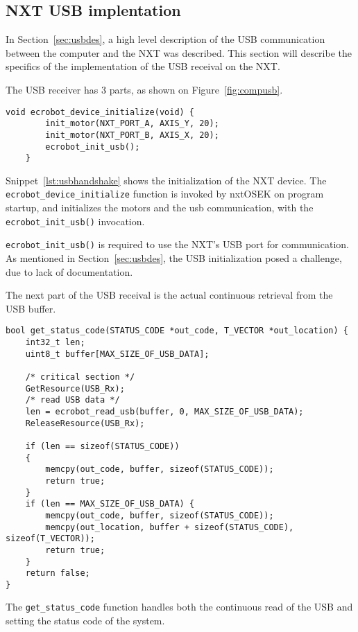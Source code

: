 \subsection{NXT USB implentation}
\label{sec:nxtusbimp}
In Section~\ref{sec:usbdes}, a high level description of the USB communication between the computer and the NXT was described.
This section will describe the specifics of the implementation of the USB receival on the NXT.

The USB receiver has 3 parts, as shown on Figure~\ref{fig:compusb}.

\begin{lstlisting}[language=CSharp,label={lst:usbhandshake},caption={ecrobot\_device\_initialize method from nxt.c}]
    void ecrobot_device_initialize(void) {
        init_motor(NXT_PORT_A, AXIS_Y, 20);
        init_motor(NXT_PORT_B, AXIS_X, 20);
        ecrobot_init_usb();
    }
\end{lstlisting}


Snippet~\ref{lst:usbhandshake} shows the initialization of the NXT device.
The \texttt{ecrobot\_device\_initialize} function is invoked by nxtOSEK on program startup, and initializes the motors and the usb communication, with the \texttt{ecrobot\_init\_usb()} invocation.

\texttt{ecrobot\_init\_usb()} is required to use the NXT's USB port for communication.
As mentioned in Section~\ref{sec:usbdes}, the USB initialization posed a challenge, due to lack of documentation.

The next part of the USB receival is the actual continuous retrieval from the USB buffer.
\begin{lstlisting}[language=CSharp,label={lst:usbreceive},caption={get\_status\_code method from usb.c}]
bool get_status_code(STATUS_CODE *out_code, T_VECTOR *out_location) {
	int32_t len;
	uint8_t buffer[MAX_SIZE_OF_USB_DATA];

	/* critical section */
	GetResource(USB_Rx);
	/* read USB data */
	len = ecrobot_read_usb(buffer, 0, MAX_SIZE_OF_USB_DATA);
	ReleaseResource(USB_Rx);

	if (len == sizeof(STATUS_CODE))
	{
		memcpy(out_code, buffer, sizeof(STATUS_CODE));
		return true;
	}
	if (len == MAX_SIZE_OF_USB_DATA) {
		memcpy(out_code, buffer, sizeof(STATUS_CODE));
		memcpy(out_location, buffer + sizeof(STATUS_CODE), sizeof(T_VECTOR));
		return true;
	}
	return false;
}
\end{lstlisting}
The \texttt{get\_status\_code} function handles both the continuous read of the USB and setting the status code of the system.

